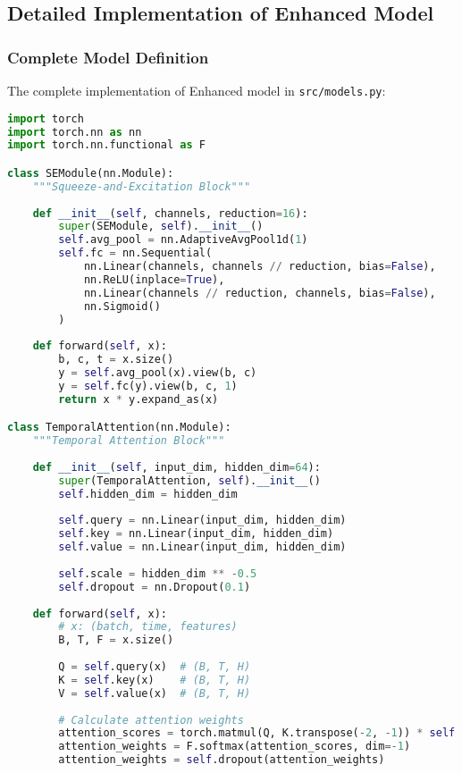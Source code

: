 \subsection{Detailed Implementation of Enhanced Model}
\label{subsec:enhanced_implementation}

\subsubsection{Complete Model Definition}
The complete implementation of Enhanced model in \texttt{src/models.py}:

\begin{lstlisting}[language=Python,caption=Complete Implementation of Enhanced Model]
import torch
import torch.nn as nn
import torch.nn.functional as F

class SEModule(nn.Module):
    """Squeeze-and-Excitation Block"""
    
    def __init__(self, channels, reduction=16):
        super(SEModule, self).__init__()
        self.avg_pool = nn.AdaptiveAvgPool1d(1)
        self.fc = nn.Sequential(
            nn.Linear(channels, channels // reduction, bias=False),
            nn.ReLU(inplace=True),
            nn.Linear(channels // reduction, channels, bias=False),
            nn.Sigmoid()
        )
    
    def forward(self, x):
        b, c, t = x.size()
        y = self.avg_pool(x).view(b, c)
        y = self.fc(y).view(b, c, 1)
        return x * y.expand_as(x)

class TemporalAttention(nn.Module):
    """Temporal Attention Block"""
    
    def __init__(self, input_dim, hidden_dim=64):
        super(TemporalAttention, self).__init__()
        self.hidden_dim = hidden_dim
        
        self.query = nn.Linear(input_dim, hidden_dim)
        self.key = nn.Linear(input_dim, hidden_dim)
        self.value = nn.Linear(input_dim, hidden_dim)
        
        self.scale = hidden_dim ** -0.5
        self.dropout = nn.Dropout(0.1)
        
    def forward(self, x):
        # x: (batch, time, features)
        B, T, F = x.size()
        
        Q = self.query(x)  # (B, T, H)
        K = self.key(x)    # (B, T, H)
        V = self.value(x)  # (B, T, H)
        
        # Calculate attention weights
        attention_scores = torch.matmul(Q, K.transpose(-2, -1)) * self.scale
        attention_weights = F.softmax(attention_scores, dim=-1)
        attention_weights = self.dropout(attention_weights)
        

\end{lstlisting}

